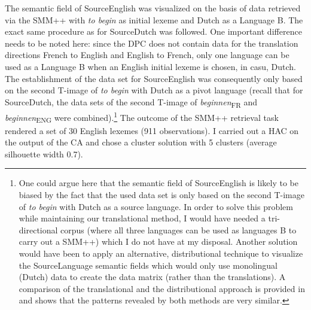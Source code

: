 The semantic field of SourceEnglish was visualized on the basis of data retrieved via the SMM++ with \textit{to begin} as initial lexeme and Dutch as a Language B. The exact same procedure as for SourceDutch was followed. One important difference needs to be noted here: since the DPC does not contain data for the translation directions French to English and English to French, only one language can be used as a Language B when an English initial lexeme is chosen, in casu, Dutch. The establishment of the data set for SourceEnglish was consequently only based on the second T-image of \textit{to begin} with Dutch as a pivot language (recall that for SourceDutch, the data sets of the second T-image of \textit{beginnen}\textsubscript{FR} and \textit{beginnen}\textsubscript{ENG} were combined).\footnote{One could argue here that the semantic field of SourceEnglish is likely to be biased by the fact that the used data set is only based on the second T-image of \textit{to begin} with Dutch as a source language. In order to solve this problem while maintaining our translational method, I would have needed a tri-directional corpus (where all three languages can be used as languages B to carry out a SMM++) which I do not have at my disposal. Another solution would have been to apply an alternative, distributional technique to visualize the SourceLanguage semantic fields which would only use monolingual (Dutch) data to create the data matrix (rather than the translations). A comparison of the translational and the distributional approach is provided in \citet{vandevoorde_distributional_2016} and shows that the patterns revealed by both methods are very similar.} The outcome of the SMM++ retrieval task rendered a set of 30 English lexemes (911 observations). I carried out a HAC on the output of the CA and chose a cluster solution with 5 clusters (average silhouette width 0.7).

